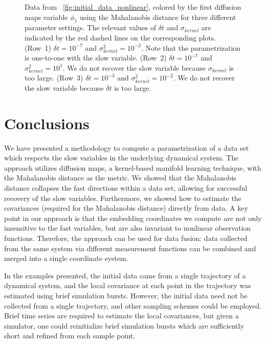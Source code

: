 \begin{figure}[t]
\caption[Analysis of nonlinear multiscale data for different parameter settings]{Data from \fig~\ref{fig:initial_data_nonlinear}, colored by the first diffusion maps variable $\phi_1$ using the Mahalanobis distance for three different parameter settings. The relevant values of $\delta t$ and $\sigma_{kernel}$ are indicated by the red dashed lines on the corresponding plots.  (Row~1) $\delta t = 10^{-7}$ and $\sigma_{kernel}^2 = 10^{-2}$. Note that the parametrization is one-to-one with the slow variable.  (Row~2) $\delta t = 10^{-7}$ and $\sigma_{kernel}^2 = 10^{1}$. We do not recover the slow variable because $\sigma_{kernel}$ is too large. (Row~3)  $\delta t = 10^{-3}$ and $\sigma_{kernel}^2 = 10^{-2}$. We do not recover the slow variable because $\delta t$ is too large.  }
\label{fig:colored_data_nonlinear_cases}
\end{figure}


\section{Conclusions}

We have presented a methodology to compute a parametrization of a data set which respects the slow variables in the underlying dynamical system.
%
The approach utilizes diffusion maps, a kernel-based manifold learning technique, with the Mahalanobis distance as the metric.
%
We showed that the Mahalanobis distance collapses the fast directions within a data set, allowing for successful recovery of the slow variables.
%
Furthermore, we showed how to estimate the covariances (required for the Mahalanobis distance) directly from data.
%
A key point in our approach is that the embedding coordinates we compute are not only insensitive to the fast variables, but are also invariant to nonlinear observation functions.
%
Therefore, the approach can be used for data fusion: data collected from the same system via different measurement functions can be combined and merged into a single coordinate system.

In the examples presented, the initial data came from a single trajectory of a dynamical system, and the local covariance at each point in the trajectory was estimated using brief simulation bursts.
%
However, the initial data need not be collected from a single trajectory, and other sampling schemes could be employed.
%
Brief time series are required to estimate the local covariances, but given a simulator, one could reinitialize brief simulation bursts which are sufficiently short and refined from each sample point.


